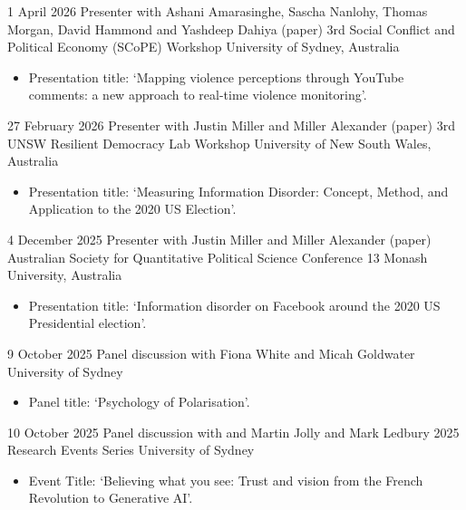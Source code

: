 \documentclass[12pt,a4paper,sans]{moderncv}
\begin{document}
\cventry
{1 April 2026}
{Presenter with Ashani Amarasinghe, Sascha Nanlohy, Thomas Morgan, David Hammond and Yashdeep Dahiya (paper)}
{3rd Social Conflict and Political Economy (SCoPE) Workshop}
{University of Sydney, Australia}
{}
{
\begin{itemize} %
\item {Presentation title: `Mapping violence perceptions through YouTube comments: a new approach to real-time violence monitoring'. \href{https://fraba.github.io/presentation/2026-SCOPE}{\faLink}}
\end{itemize}
}

\cventry
{27 February 2026}
{Presenter with Justin Miller and Miller Alexander (paper)}
{3rd UNSW Resilient Democracy Lab Workshop}
{University of New South Wales, Australia}
{}
{
\begin{itemize} %
\item {Presentation title: `Measuring Information Disorder: Concept, Method, and Application to the 2020 US Election'. \href{https://fraba.github.io/presentation/2026-UNSW}{\faLink}}
\end{itemize}
}

\cventry
{4 December 2025}
{Presenter with Justin Miller and Miller Alexander (paper)}
{Australian Society for Quantitative Political Science Conference 13}
{Monash University, Australia}
{}
{
\begin{itemize} %
\item {Presentation title: `Information disorder on Facebook around the 2020 US Presidential election'. \href{https://fraba.github.io/presentation/2025-ASQPS}{\faLink}}
\end{itemize}
}

\cventry
{9 October 2025}
{Panel discussion with Fiona White and Micah Goldwater}
{}
{University of Sydney}
{}
{
\begin{itemize} %
\item {Panel title: `Psychology of Polarisation'. \href{https://www.sydney.edu.au/science/news-and-events/events/divided-or-untied.html}{\faLink}}
\end{itemize}
}

\cventry
{10 October 2025}
{Panel discussion with and Martin Jolly and Mark Ledbury}
{2025 Research Events Series}
{University of Sydney}
{}
{
\begin{itemize} %
\item {Event Title: `Believing what you see: Trust and vision from the French Revolution to Generative AI'.}
\end{itemize}
}
\end{document}
